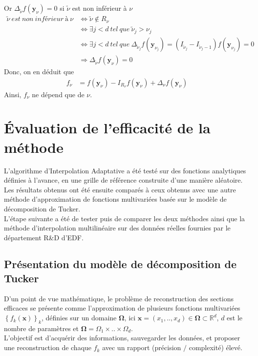 Or $\Delta_{\tilde{\nu}} f(\textbf{y}_{\nu}) = 0$ si $\tilde{\nu}$ est non inférieur à $\nu$\\
\begin{align}
		\tilde{\nu}\ est\ non\ inférieur\ à\ \nu 		&	\Leftrightarrow \tilde{\nu} \notin R_{\nu}  \nonumber \\
																								&	\Leftrightarrow \exists j<d\ tel\ que\ \tilde{\nu}_j > \nu_j  \nonumber \\
																								&	\Leftrightarrow \exists j<d\ tel\ que\ \Delta_{\tilde{\nu}_j} f(\textbf{y}_{\nu_j}) = (I_{\tilde{\nu}_j} - I_{\tilde{\nu}_j-1}) f(\textbf{y}_{\nu_j}) = 0 \nonumber \\
																								&	\Rightarrow \Delta_{\tilde{\nu}} f(\textbf{y}_{\nu}) = 0 \nonumber
\end{align}
Donc, on en déduit que
\begin{align}
		f_{\nu} &= f(\textbf{y}_{\nu}) - I_{R_{\nu}}f(\textbf{y}_{\nu}) + \Delta_{\nu}f(\textbf{y}_{\nu}) \nonumber
\end{align}
Ainsi, $f_{\nu}$ ne dépend que de $\nu$.


\section{Évaluation de l'efficacité de la méthode}\label{sec:5}
\hspace{0.5cm} L'algorithme d'Interpolation Adaptative a été testé sur des fonctions analytiques définies à l'avance, en une grille de référence construite d'une manière aléatoire.\\
Les résultats obtenus ont été ensuite comparés à ceux obtenus avec une autre méthode d'approximation de fonctions multivariées basée sur le modèle de décomposition de Tucker.\\
L'étape suivante a été de tester puis de comparer les deux méthodes ainsi que la méthode d'interpolation multilinéaire sur des données réelles fournies par le département R\&D d'EDF.

\subsection{Présentation du modèle de décomposition de Tucker}
\hspace{0.5cm} D'un point de vue mathématique, le problème de reconstruction des sections efficaces se présente comme l'approximation de plusieurs fonctions multivariées $\left \{ f_k(\mathbf{x}) \right \}_k$, définies sur un domaine $\mathbf{\Omega}$, ici $\mathbf{x} = (x_1,..,x_d) \in \mathbf{\Omega} \subset \mathbb{R}^d$, $d$ est le nombre de paramètres et $\mathbf{\Omega} = \Omega_1 \times .. \times \Omega_d$.\\
L'objectif est d'acquérir des informations, sauvegarder les données, et proposer une reconstruction de chaque $f_k$ avec un rapport (précision $/$ complexité) élevé.
